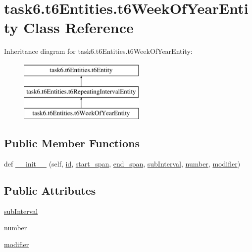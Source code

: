 \hypertarget{classtask6_1_1t6Entities_1_1t6WeekOfYearEntity}{}\section{task6.\+t6\+Entities.\+t6\+Week\+Of\+Year\+Entity Class Reference}
\label{classtask6_1_1t6Entities_1_1t6WeekOfYearEntity}
Inheritance diagram for task6.\+t6\+Entities.\+t6\+Week\+Of\+Year\+Entity\+:\begin{figure}[H]
\begin{center}
\leavevmode
\includegraphics[height=3.000000cm]{classtask6_1_1t6Entities_1_1t6WeekOfYearEntity}
\end{center}
\end{figure}
\subsection*{Public Member Functions}
\begin{DoxyCompactItemize}
\item 
def \hyperlink{classtask6_1_1t6Entities_1_1t6WeekOfYearEntity_a93a81ec940eb104bf23c399f657f3444}{\+\_\+\+\_\+init\+\_\+\+\_\+} (self, \hyperlink{classtask6_1_1t6Entities_1_1t6Entity_a96b2e7fb553c920ab2db6f6deb31e3b4}{id}, \hyperlink{classtask6_1_1t6Entities_1_1t6Entity_a8221c36d2995a24200cdfbd74cc9233c}{start\+\_\+span}, \hyperlink{classtask6_1_1t6Entities_1_1t6Entity_a597d42bb02fc9f42277098f0ce21917c}{end\+\_\+span}, \hyperlink{classtask6_1_1t6Entities_1_1t6WeekOfYearEntity_a6e216a0eeb8e1e9f8b8a7f30fdfff618}{sub\+Interval}, \hyperlink{classtask6_1_1t6Entities_1_1t6WeekOfYearEntity_ac5530a69a336579c3f12f2530d68bf21}{number}, \hyperlink{classtask6_1_1t6Entities_1_1t6WeekOfYearEntity_aa4de7fbb874496562574327b5cbde180}{modifier})
\end{DoxyCompactItemize}
\subsection*{Public Attributes}
\begin{DoxyCompactItemize}
\item 
\hyperlink{classtask6_1_1t6Entities_1_1t6WeekOfYearEntity_a6e216a0eeb8e1e9f8b8a7f30fdfff618}{sub\+Interval}
\item 
\hyperlink{classtask6_1_1t6Entities_1_1t6WeekOfYearEntity_ac5530a69a336579c3f12f2530d68bf21}{number}
\item 
\hyperlink{classtask6_1_1t6Entities_1_1t6WeekOfYearEntity_aa4de7fbb874496562574327b5cbde180}{modifier}
\end{DoxyCompactItemize}


